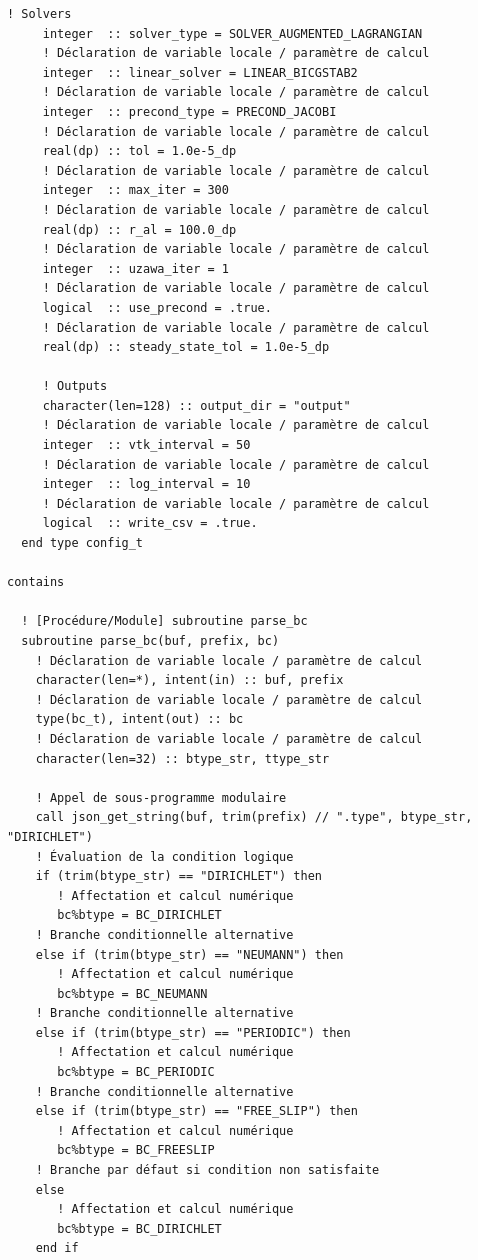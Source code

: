 \documentclass[10pt,a4paper,oneside]{book}
\begin{document}
\begin{lstlisting}[language={[95]Fortran}]
     ! Solvers
     integer  :: solver_type = SOLVER_AUGMENTED_LAGRANGIAN
     ! Déclaration de variable locale / paramètre de calcul
     integer  :: linear_solver = LINEAR_BICGSTAB2
     ! Déclaration de variable locale / paramètre de calcul
     integer  :: precond_type = PRECOND_JACOBI
     ! Déclaration de variable locale / paramètre de calcul
     real(dp) :: tol = 1.0e-5_dp
     ! Déclaration de variable locale / paramètre de calcul
     integer  :: max_iter = 300
     ! Déclaration de variable locale / paramètre de calcul
     real(dp) :: r_al = 100.0_dp
     ! Déclaration de variable locale / paramètre de calcul
     integer  :: uzawa_iter = 1
     ! Déclaration de variable locale / paramètre de calcul
     logical  :: use_precond = .true.
     ! Déclaration de variable locale / paramètre de calcul
     real(dp) :: steady_state_tol = 1.0e-5_dp

     ! Outputs
     character(len=128) :: output_dir = "output"
     ! Déclaration de variable locale / paramètre de calcul
     integer  :: vtk_interval = 50
     ! Déclaration de variable locale / paramètre de calcul
     integer  :: log_interval = 10
     ! Déclaration de variable locale / paramètre de calcul
     logical  :: write_csv = .true.
  end type config_t

contains

  ! [Procédure/Module] subroutine parse_bc
  subroutine parse_bc(buf, prefix, bc)
    ! Déclaration de variable locale / paramètre de calcul
    character(len=*), intent(in) :: buf, prefix
    ! Déclaration de variable locale / paramètre de calcul
    type(bc_t), intent(out) :: bc
    ! Déclaration de variable locale / paramètre de calcul
    character(len=32) :: btype_str, ttype_str

    ! Appel de sous-programme modulaire
    call json_get_string(buf, trim(prefix) // ".type", btype_str, "DIRICHLET")
    ! Évaluation de la condition logique
    if (trim(btype_str) == "DIRICHLET") then
       ! Affectation et calcul numérique
       bc%btype = BC_DIRICHLET
    ! Branche conditionnelle alternative
    else if (trim(btype_str) == "NEUMANN") then
       ! Affectation et calcul numérique
       bc%btype = BC_NEUMANN
    ! Branche conditionnelle alternative
    else if (trim(btype_str) == "PERIODIC") then
       ! Affectation et calcul numérique
       bc%btype = BC_PERIODIC
    ! Branche conditionnelle alternative
    else if (trim(btype_str) == "FREE_SLIP") then
       ! Affectation et calcul numérique
       bc%btype = BC_FREESLIP
    ! Branche par défaut si condition non satisfaite
    else
       ! Affectation et calcul numérique
       bc%btype = BC_DIRICHLET
    end if


\end{lstlisting}
\end{document}
